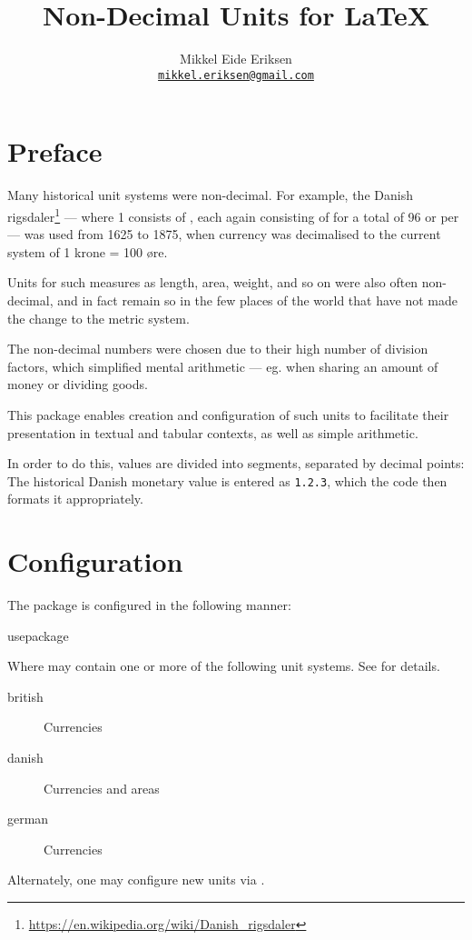 \documentclass{article}
\title{Non-Decimal Units for \LaTeX}
\author{Mikkel Eide Eriksen\\\href{mailto:mikkel.eriksen@gmail.com}{\texttt{mikkel.eriksen@gmail.com}}}
\begin{document}
\maketitle

\section{Preface} %

Many historical unit systems were non-decimal. For example, the Danish rigsdaler\footnote{\url{https://en.wikipedia.org/wiki/Danish_rigsdaler}} --- where 1  consists of  , each again consisting of   for a total of 96  or  per  --- was used from 1625 to 1875, when currency was decimalised to the current system of 1 krone = 100 øre.


Units for such measures as length, area, weight, and so on were also often non-decimal, and in fact remain so in the few places of the world that have not made the change to the metric system.

The non-decimal numbers were chosen due to their high number of division factors, which simplified mental arithmetic --- eg. when sharing an amount of money or dividing goods.

This package enables creation and configuration of such units to facilitate their presentation in textual and tabular contexts, as well as simple arithmetic.

In order to do this, values are divided into segments, separated by decimal points: The historical Danish monetary value  is entered as \texttt{1.2.3}, which the code then formats it appropriately.

\clearpage
\section{Configuration} %

The package is configured in the following manner:

\begin{docCommand}
	{usepackage}
	{}

Where  may contain one or more of the following unit systems. See  for details.

\begin{description}
\item[british] Currencies
\item[danish] Currencies and areas
\item[german] Currencies
\end{description}

Alternately, one may configure new units via .

\end{docCommand}
\end{document}
